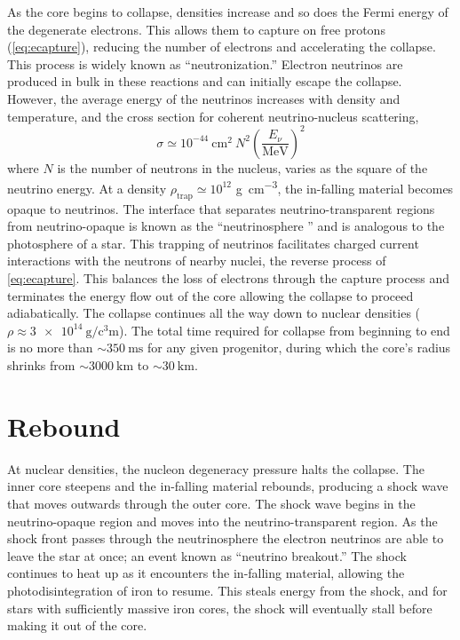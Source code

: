 		As the core begins to collapse, densities increase and so does the Fermi energy of the degenerate electrons. This allows them to capture on free protons (\EQ \ref{eq:ecapture}), reducing the number of electrons and accelerating the collapse. This process is widely known as ``neutronization.'' Electron neutrinos are produced in bulk in these reactions and can initially escape the collapse. However, the average energy of the neutrinos increases with density and temperature, and the cross section for coherent neutrino-nucleus scattering, 
		\begin{equation}
		\label{eq:nuScatXSection}
			\sigma \simeq 10^{-44} \ \text{cm}^2 \ N^2 \left(\frac{E_\nu}{\text{MeV}}\right)^2
		\end{equation}
		where $N$ is the number of neutrons in the nucleus, varies as the square of the neutrino energy. At a density $\rho_{\text{trap}} \simeq 10^{12}$ \si{\gram\per\cubic\centi\metre}, the in-falling material becomes opaque to neutrinos. The interface that separates neutrino-transparent regions from neutrino-opaque is known as the ``neutrinosphere
		'' and is analogous to the photosphere of a star. This trapping of neutrinos facilitates charged current interactions with the neutrons of nearby nuclei, the reverse process of \EQ \ref{eq:ecapture}. This balances the loss of electrons through the capture process and terminates the energy flow out of the core allowing the collapse to proceed adiabatically. The collapse continues all the way down to nuclear densities ($\rho \approx \SI{3e14}{\gram\per\cubic\centi\metre}$\cite{Janka2012,Janka2012a,particleastro}). The total time required for collapse from beginning to end is no more than $\sim\SI{350}{\milli\second}$ for any given progenitor\cite{Burrows2013}, during which the core's radius shrinks from $\sim \SI{3000}{\kilo\metre}$ to $\sim \SI{30}{\kilo\metre}$\cite{Woosley2006}.
	
	\section{Rebound}
		At nuclear densities, the nucleon degeneracy pressure halts the collapse. The inner core steepens and the in-falling material rebounds, producing a shock wave that moves outwards through the outer core. The shock wave begins in the neutrino-opaque region and moves into the neutrino-transparent region. As the shock front passes through the neutrinosphere the electron neutrinos are able to leave the star at once; an event known as ``neutrino breakout.'' The shock continues to heat up as it encounters the in-falling material, allowing the photodisintegration of iron to resume. This steals energy from the shock, and for stars with sufficiently massive iron cores, the shock will eventually stall before making it out of the core.

